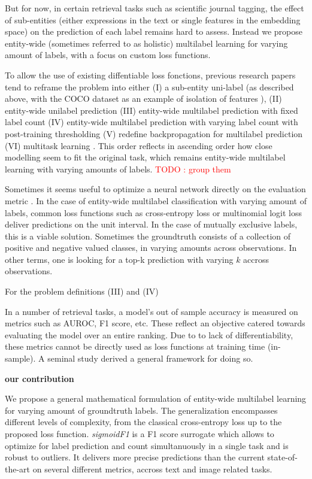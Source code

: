 \documentclass[sigconf,natbib,screen=true,review=true,anonymous]{acmart}
\newcommand\todo[1]{\textcolor{red}{TODO : #1}}
\begin{document}
But for now, in certain retrieval tasks such as scientific journal tagging, the effect of sub-entities (either expressions in the text or single features in the embedding space) on the prediction of each label remains hard to assess. Instead we propose entity-wide (sometimes referred to as holistic) multilabel learning for varying amount of labels, with a focus on custom loss functions.

To allow the use of existing diffentiable loss fonctions, previous research papers tend to reframe the problem into either (I) a sub-entity uni-label (as described above, with the COCO dataset as an example of isolation of features \cite{COCO}), (II) entity-wide unilabel prediction (III) entity-wide multilabel prediction with fixed label count (IV) entity-wide multilabel prediction with varying label count with post-training thresholding (V) redefine backpropagation for multilabel prediction \cite{multilabelBackprop} (VI) multitask learning \cite{multitaskLabel}. This order reflects in ascending order how close modelling seem to fit the original task, which remains entity-wide multilabel learning with varying amounts of labels. \todo{group them}

Sometimes it seems useful to optimize a neural network directly on the evaluation metric \cite{optimizableLosses}. In the case of entity-wide multilabel classification with varying amount of labels, common loss functions such as cross-entropy loss or multinomial logit loss deliver predictions on the unit interval. In the case of mutually exclusive labels, this is a viable solution. Sometimes the groundtruth consists of a collection of positive and negative valued classes, in varying amounts across observations. In other terms, one is  looking for a top-k prediction with varying \(k\) accross observations.



For the problem definitions (III) and (IV)


In a number of retrieval tasks, a model's out of sample accuracy is measured on metrics such as AUROC, F1 score, etc. These reflect an objective catered towards evaluating the model over an entire ranking. Due to to lack of differentiability, these metrics cannot be directly used as loss functions at training time (in-sample). A seminal study \cite{optimizableLosses} derived a general framework for doing so. 

\textbf{\textbf{our contribution}}

We propose a general mathematical formulation of entity-wide multilabel learning for varying amount of groundtruth labels. The generalization encompasses different levels of complexity, from the classical cross-entropy loss up to the proposed loss function. \emph{sigmoidF1} is a F1 score surrogate which allows to optimize for label prediction and count simultanuously in a single task and is robust to outliers. It delivers more precise predictions than the current state-of-the-art on several different metrics, accross text and image related tasks.
\end{document}
